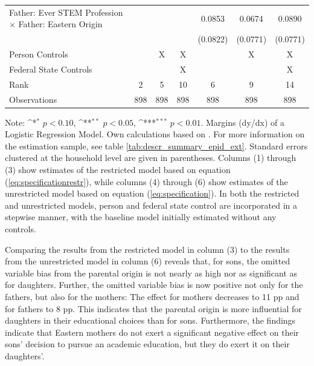\documentclass[a4paper, oneside, hyperfootnotes = false]{article}
\def\sym#1{\ifmmode^{#1}\else\(^{#1}\)\fi}
\begin{document}
{\begin{landscape}
\begin{table}[ht]
\begin{center}
{\begin{tabular}{l*{6}{c}}
					\addlinespace
					Father: Ever STEM Profession $\times$ Father: Eastern Origin&                     &                     &                     &      0.0853         &      0.0674         &      0.0890         \\
					&                     &                     &                     &    (0.0822)         &    (0.0771)         &    (0.0771)         \\
					\midrule
					Person Controls & & X  & X & & X & X \\
					Federal State Controls & & & X & & & X \\
					Rank                &      2         &      5         &     10         &      6         &      9         &     14         \\
					Observations   &    898         &    898         &    898         &    898         &    898         &    898         \\
					\bottomrule
			\end{tabular}}
			
			\vspace{2mm}
			
			\parbox{15cm}{
				\linespread{1}\footnotesize Note: \sym{*} \(p<0.10\), \sym{**} \(p<0.05\), \sym{***} \(p<0.01\). Margins (dy/dx) of a Logistic Regression Model. Own calculations based on \cite{SOEP2023}. For more information on the estimation sample, see table \ref{tab:descr_summary_epid_ext}. Standard errors clustered at the household level are given in parentheses. Columns (1) through (3) show estimates of the restricted model based on equation (\ref{eq:specificationrestr}), while columns (4) through (6) show estimates of the unrestricted model based on equation (\ref{eq:specification}). In both the restricted and unrestricted models, person and federal state control are incorporated in a stepwise manner, with the baseline model initially estimated without any controls.}
			
		\end{center}
	\end{table}
\end{landscape}

Comparing the results from the restricted model in column (3) to the results from the unrestricted model in column (6) reveals that, for sons, the omitted variable bias from the parental origin is not nearly as high nor as significant as for daughters.
Further, the omitted variable bias is now positive not only for the fathers, but also for the mothers:
The effect for mothers decreases to 11 pp and for fathers to 8 pp.
This indicates that the parental origin is more influential for daughters in their educational choices than for sons.
Furthermore, the findings indicate that Eastern mothers do not exert a significant negative effect on their sons' decision to pursue an academic education, but they do exert it on their daughters'.

}
\end{document}
